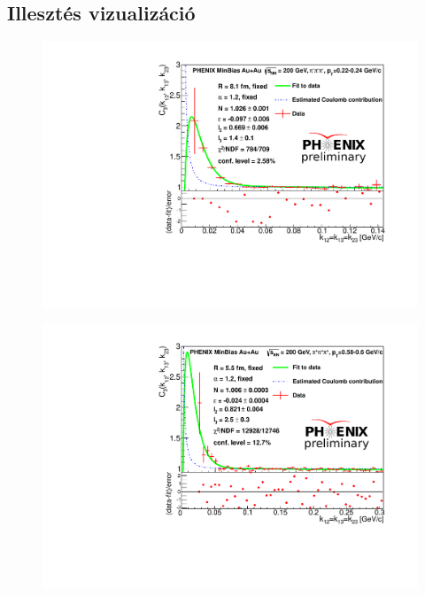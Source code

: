 \documentclass[10pt,a4paper]{article}
\numberwithin{equation}{subsection}
\numberwithin{figure}{section}
\begin{document}
\subsection{Illesztés vizualizáció}
\begin{figure}[H]
\centering
\includegraphics[scale=0.6]{pic/res/diag_lowpt.pdf}
\end{figure}
\begin{figure}[H]
\centering
\includegraphics[scale=0.6]{pic/res/diag_highpt.pdf}
\end{figure}
\end{document}
